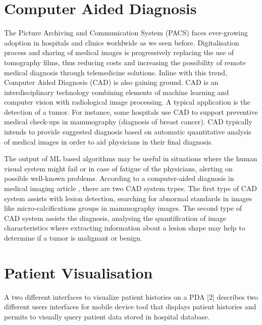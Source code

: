 \section{Computer Aided Diagnosis}

The Picture Archiving and Communication System (PACS) \cite{oosterwijk2004pacs} faces ever-growing adoption in hospitals and clinics worldwide \cite{lemke2003pacs} as we seen before. Digitalisation process and sharing of medical images is progressively replacing the use of tomography films, thus reducing costs and increasing the possibility of remote medical diagnosis through telemedicine solutions. Inline with this trend, Computer Aided Diagnosis (CAD) \cite{giger1993computer} is also gaining ground. CAD is an interdisciplinary technology combining elements of machine learning and computer vision with radiological image processing. A typical application is the detection of a tumor. For instance, some hospitals use CAD to support preventive medical check-ups in mammography (diagnosis of breast cancer). CAD typically intends to provide suggested diagnosis based on automatic quantitative analysis of medical images in order to aid physicians in their final diagnosis.

\clearpage

The output of ML based algorithms may be useful in situations where the human visual system might fail or in case of fatigue of the physicians, alerting on possible well-known problems. According to a computer-aided diagnosis in medical imaging article \cite{giger1993computer}, there are two CAD system types. The first type of CAD system assists with lesion detection, searching for abnormal standards in images like micro-calcifications groups in mammography images. The second type of CAD system assists the diagnosis, analysing the quantification of image characteristics where extracting information about a lesion shape may help to determine if a tumor is malignant or benign.

\section{Patient Visualisation}

A two different interfaces to visualize patient histories on a PDA [2] describes two different users interfaces for mobile device tool that displays patient histories and permits to visually query patient data stored in hospital database.

